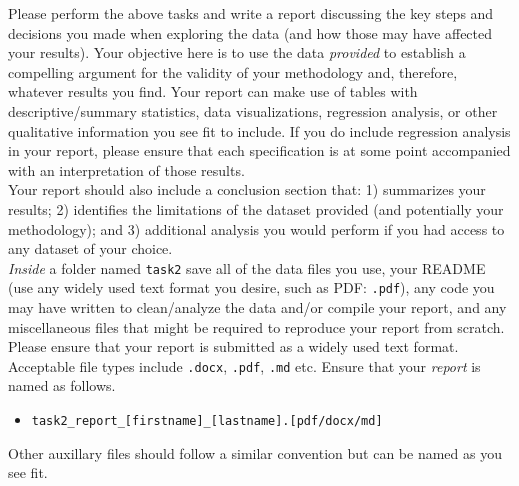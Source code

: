 \documentclass[11pt, letterpaper, twoside]{article}
\begin{document}
Please perform the above tasks and write a report discussing the key steps and decisions you made when exploring the data (and how those may have affected your results). Your objective here is to use the data \textit{provided} to establish a compelling argument for the validity of your methodology and, therefore, whatever results you find. Your report can make use of tables with descriptive/summary statistics, data visualizations, regression analysis, or other qualitative information you see fit to include. If you do include regression analysis in your report, please ensure that each specification is at some point accompanied with an interpretation of those results.\\

Your report should also include a conclusion section that: 1) summarizes your results; 2) identifies the limitations of the dataset provided (and potentially your methodology); and 3) additional analysis you would perform if you had access to any dataset of your choice.\\

\textit{Inside} a folder named \verb|task2| save all of the data files you use, your README (use any widely used text format you desire, such as PDF: \verb|.pdf|), any code you may have written to clean/analyze the data and/or compile your report, and any miscellaneous files that might be required to reproduce your report from scratch. Please ensure that your report is submitted as a widely used text format. Acceptable file types include \verb|.docx|, \verb|.pdf|, \verb|.md| etc. Ensure that your \textit{report} is named as follows.
\begin{itemize}
    \item \verb|task2_report_[firstname]_[lastname].[pdf/docx/md]|
\end{itemize}
Other auxillary files should follow a similar convention but can be named as you see fit.
\end{document}
